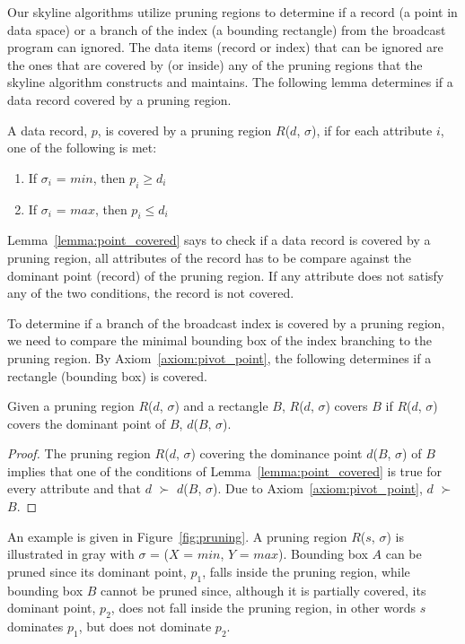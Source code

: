 Our skyline algorithms utilize pruning regions to determine if a record (a point in data space) or a branch of the index (a bounding rectangle) from the broadcast program can ignored. The data items (record or index) that can be ignored are the ones that are covered by (or inside) any of the pruning regions that the skyline algorithm constructs and maintains. The following lemma determines if a data record covered by a pruning region.

\begin{lemma}\label{lemma:point_covered}
A data record, $p$, is covered by a pruning region $R$($d$, $\sigma$), if for each attribute $i$, one of the following is met:
\begin{enumerate}
  \item If $\sigma_i$ = $min$, then $p_i \geq d_i$
  \item If $\sigma_i$ = $max$, then $p_i \leq d_i$
\end{enumerate}
\end{lemma}

Lemma~\ref{lemma:point_covered} says to check if a data record is covered by a pruning region, all attributes of the record has to be compare against the dominant point (record) of the pruning region. If any attribute does not satisfy any of the two conditions, the record is not covered.

To determine if a branch of the broadcast index is covered by a pruning region, we need to compare the minimal bounding box of the index branching to the pruning region. By Axiom~\ref{axiom:pivot_point}, the following determines if a rectangle (bounding box) is covered.

\begin{lemma}\label{lemma:rect_covered}
Given a pruning region $R$($d$, $\sigma$) and a rectangle $B$, $R$($d$, $\sigma$) covers $B$ if $R$($d$, $\sigma$) covers the dominant point of $B$, $d$($B$, $\sigma$).
\end{lemma}

\begin{proof}
The pruning region $R$($d$, $\sigma$) covering the dominance point $d$($B$, $\sigma$) of $B$ implies that one of the conditions of Lemma~\ref{lemma:point_covered} is true for every attribute and that $d$ $\succ$ $d$($B$, $\sigma$). Due to Axiom~\ref{axiom:pivot_point}, $d$ $\succ$ $B$.
\end{proof}

An example is given in Figure~\ref{fig:pruning}. A pruning region $R$($s$, $\sigma$) is illustrated in gray with $\sigma$ = ($X$ = $min$, $Y$ = $max$). Bounding box $A$ can be pruned since its dominant point, $p_1$, falls inside the pruning region, while bounding box $B$ cannot be pruned since, although it is partially covered, its dominant point, $p_2$, does not fall inside the pruning region, in other words $s$ dominates $p_1$, but does not dominate $p_2$.

